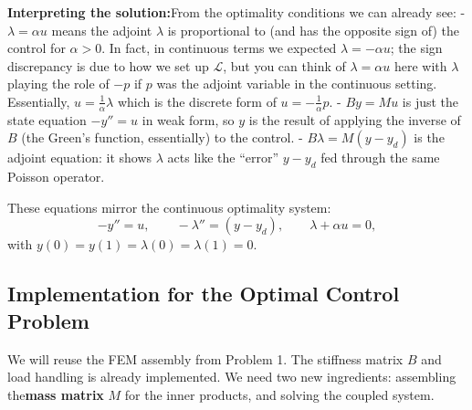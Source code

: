 \documentclass[a4paper,10pt]{report}
\begin{document}
\textbf{Interpreting the solution:}From the optimality conditions we can already see:
- \(\lambda = \alpha u\) means the adjoint \(\lambda\) is proportional to (and has the opposite sign of) the control for \(\alpha>0\). In fact, in continuous terms we expected \(\lambda = -\alpha u\); the sign discrepancy is due to how we set up \(\mathcal{L}\), but you can think of \(\lambda = \alpha u\) here with \(\lambda\) playing the role of \(-p\) if \(p\) was the adjoint variable in the continuous setting. Essentially, \(u = \frac{1}{\alpha}\lambda\) which is the discrete form of \(u = -\frac{1}{\alpha}p\).
- \(B y = M u\) is just the state equation \(-y'' = u\) in weak form, so \(y\) is the result of applying the inverse of \(B\) (the Green's function, essentially) to the control.
- \(B \lambda = M(y - y_d)\) is the adjoint equation: it shows \(\lambda\) acts like the “error” \(y-y_d\) fed through the same Poisson operator.

These equations mirror the continuous optimality system:
\[ -y'' = u, \qquad -\lambda'' = (y - y_d), \qquad \lambda + \alpha u = 0, \]
with \(y(0)=y(1)=\lambda(0)=\lambda(1)=0\).

\subsection{ Implementation for the Optimal Control Problem}
We will reuse the FEM assembly from Problem 1. The stiffness matrix \(B\) and load handling is already implemented. We need two new ingredients: assembling the\textbf{mass matrix} \(M\) for the inner products, and solving the coupled system.
\end{document}
